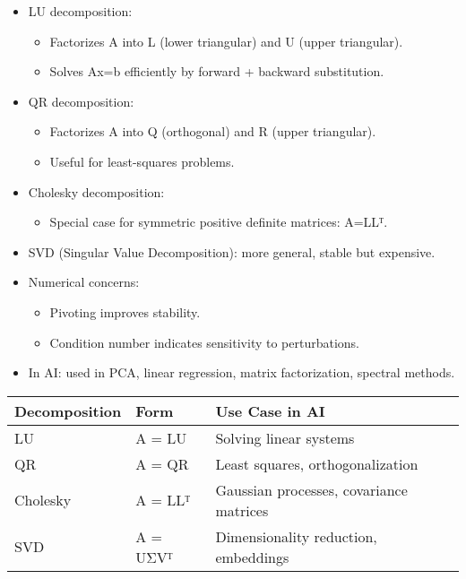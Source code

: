 \documentclass[
  letterpaper,
  DIV=11,
  numbers=noendperiod]{scrreprt}
\providecommand{\tightlist}{%
  \setlength{\itemsep}{0pt}\setlength{\parskip}{0pt}}
\begin{document}
\begin{itemize}
\item
  LU decomposition:

  \begin{itemize}
  \tightlist
  \item
    Factorizes A into L (lower triangular) and U (upper triangular).
  \item
    Solves Ax=b efficiently by forward + backward substitution.
  \end{itemize}
\item
  QR decomposition:

  \begin{itemize}
  \tightlist
  \item
    Factorizes A into Q (orthogonal) and R (upper triangular).
  \item
    Useful for least-squares problems.
  \end{itemize}
\item
  Cholesky decomposition:

  \begin{itemize}
  \tightlist
  \item
    Special case for symmetric positive definite matrices: A=LLᵀ.
  \end{itemize}
\item
  SVD (Singular Value Decomposition): more general, stable but
  expensive.
\item
  Numerical concerns:

  \begin{itemize}
  \tightlist
  \item
    Pivoting improves stability.
  \item
    Condition number indicates sensitivity to perturbations.
  \end{itemize}
\item
  In AI: used in PCA, linear regression, matrix factorization, spectral
  methods.
\end{itemize}

\begin{longtable}[]{@{}lll@{}}
\toprule\noalign{}
Decomposition & Form & Use Case in AI \\
\midrule\noalign{}
\endhead
\bottomrule\noalign{}
\endlastfoot
LU & A = LU & Solving linear systems \\
QR & A = QR & Least squares, orthogonalization \\
Cholesky & A = LLᵀ & Gaussian processes, covariance matrices \\
SVD & A = UΣVᵀ & Dimensionality reduction, embeddings \\
\end{longtable}
\end{document}
